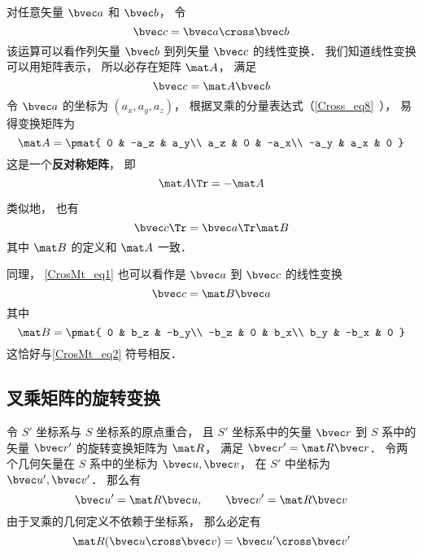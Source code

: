 
对任意矢量 $\bvec a$ 和 $\bvec b$， 令
\begin{equation}\label{CrosMt_eq1}
\bvec c = \bvec a \cross \bvec b
\end{equation}
该运算可以看作列矢量 $\bvec b$ 到列矢量 $\bvec c$ 的线性变换． 我们知道线性变换可以用矩阵表示， 所以必存在矩阵 $\mat A$， 满足
\begin{equation}\label{CrosMt_eq3}
\bvec c = \mat A \bvec b
\end{equation}
令 $\bvec a$ 的坐标为 $(a_x, a_y, a_z)$， 根据叉乘的分量表达式（\autoref{Cross_eq8}~）， 易得变换矩阵为
\begin{equation}\label{CrosMt_eq2}
\mat A = \pmat{
0 & -a_z & a_y\\
a_z & 0 & -a_x\\
-a_y & a_x & 0
}\end{equation}
这是一个\textbf{反对称矩阵}， 即
\begin{equation}
\mat A\Tr = -\mat A
\end{equation}

类似地， 也有
\begin{equation}
\bvec c\Tr = \bvec a\Tr \mat B
\end{equation}
其中 $\mat B$ 的定义和 $\mat A$ 一致．

同理， \autoref{CrosMt_eq1} 也可以看作是 $\bvec a$ 到 $\bvec c$ 的线性变换
\begin{equation}
\bvec c = \mat B \bvec a
\end{equation}
其中
\begin{equation}
\mat B = \pmat{
0 & b_z & -b_y\\
-b_z & 0 & b_x\\
b_y & -b_x & 0
}
\end{equation}
这恰好与\autoref{CrosMt_eq2} 符号相反．

\subsection{叉乘矩阵的旋转变换}\label{CrosMt_sub1}
令 $S'$ 坐标系与 $S$ 坐标系的原点重合， 且 $S'$ 坐标系中的矢量 $\bvec r$ 到 $S$ 系中的矢量 $\bvec r'$ 的旋转变换矩阵为 $\mat R$， 满足 $\bvec r' = \mat R\bvec r$． 令两个几何矢量在 $S$ 系中的坐标为 $\bvec u, \bvec v$， 在 $S'$ 中坐标为 $\bvec u', \bvec v'$． 那么有
\begin{equation}
\bvec u' = \mat R\bvec u, \qquad
\bvec v' = \mat R\bvec v
\end{equation}
由于叉乘的几何定义不依赖于坐标系， 那么必定有
\begin{equation}
\mat R(\bvec u\cross \bvec v) = \bvec u'\cross \bvec v'
\end{equation}

